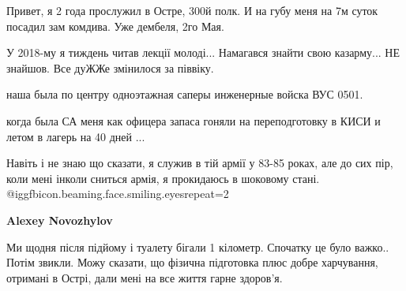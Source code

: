 \begin{itemize}
\begin{itemize}
Привет, я 2 года прослужил в Остре, 300й полк. И на губу меня на 7м суток
посадил зам комдива. Уже дембеля, 2го Мая.

\end{itemize} %


У 2018-му я тиждень читав лекції молоді... Намагався знайти свою казарму... НЕ
знайшов. Все дуЖЖе змінилося за піввіку.

\begin{itemize} %
наша была по центру одноэтажная саперы инженерные войска ВУС 0501.

когда была СА меня как офицера запаса гоняли на переподготовку в КИСИ и летом в лагерь на 40 дней ...
\end{itemize} %


Навіть і не знаю що сказати, я служив в тій армії у 83-85 роках, але до сих
пір, коли мені інколи сниться армія, я прокидаюсь в шоковому стані. @igg{fbicon.beaming.face.smiling.eyes}{repeat=2} 

\begin{itemize} %
\textbf{Alexey Novozhylov} 

Ми щодня після підйому і туалету бігали 1 кілометр. Спочатку це було важко..
Потім звикли. Можу сказати, що фізична підготовка плюс добре харчування,
отримані в Острі, дали мені на все життя гарне здоров'я.

\end{itemize} %

\end{itemize} %
